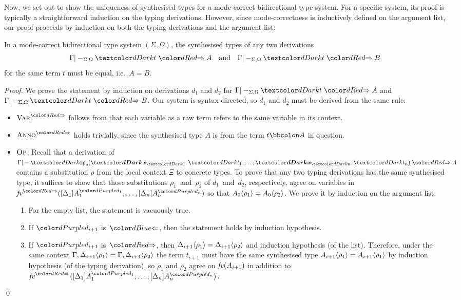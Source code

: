 Now, we set out to show the uniqueness of synthesised types for a mode-correct bidirectional type system.
For a specific system, its proof is typically a straightforward induction on the typing derivations.
However, since mode-correctness is inductively defined on the argument list, our proof proceeds by induction on both the typing derivations and the argument list:
\begin{lemma}\label{thm:unique-syn}
  In a mode-correct bidirectional type system $(\Sigma, \Omega)$, the synthesised types of any two derivations
  \[
    \Gamma |-_{\Sigma, \Omega} \isTerm{t} \syn A
    \quad\text{and}\quad
    \Gamma |-_{\Sigma, \Omega} \isTerm{t} \syn B
  \]
  for the same term $t$ must be equal, i.e.\ $A = B$.
\end{lemma}
\begin{proof}%
  We prove the statement by induction on derivations $d_1$ and $d_2$ for $\Gamma |-_{\Sigma, \Omega} \isTerm{t} \syn A$ and $\Gamma |-_{\Sigma, \Omega} \isTerm{t} \syn B$.
  Our system is syntax-directed, so $d_1$ and $d_2$ must be derived from the same rule: 
  \begin{itemize}
    \item $\SynRule{Var}$ follows from that each variable as a raw term refers to the same variable in its context.
    \item $\SynRule{Anno}$ holds trivially, since the synthesised type $A$ is from the term $t \annotatecolon A$ in question.
    \item $\textnormal{\textsc{Op}}$: Recall that a derivation of\/ $\Gamma |- \tmOpts \syn A$ contains a substitution $\rho$ from the local context $\Xi$ to concrete types.
      To prove that any two typing derivations has the same synthesised type, it suffices to show that those substitutions $\rho_1$~and~$\rho_2$ of $d_1$~and~$d_2$, respectively, agree on variables in $\synvar(\biargs)$ so that ${A_0}\!\left<{\rho_1}\right> = {A_0}\!\left<{\rho_2}\right>$.
      We prove it by induction on the argument list:
      \begin{enumerate}
        \item For the empty list, the statement is vacuously true.
        \item If $\dir{d_{i+1}}$ is~$\chk$, then the statement holds by induction hypothesis.
        \item If $\dir{d_{i+1}}$ is~$\syn$, then ${\Delta_{i+1}}\!\left<{\rho_1}\right> = {\Delta_{i+1}}\!\left<{\rho_2}\right>$ and induction hypothesis (of the list).
          Therefore, under the same context $\Gamma, {\Delta_{i+1}}\!\left<{\rho_1}\right> = \Gamma, {\Delta_{i+1}}\!\left<{\rho_2}\right>$ the term $t_{i+1}$ must have the same synthesised type ${A_{i+1}}\!\left<{\rho_1}\right> = {A_{i+1}}\!\left<{\rho_1}\right>$ by induction hypothesis (of the typing derivation), so $\rho_1$ and $\rho_2$ agree on $\mathit{fv}(A_{i+1})$ in addition to $\synvar(\biargs)$.
      \end{enumerate}
  \end{itemize}\qed
\end{proof}


